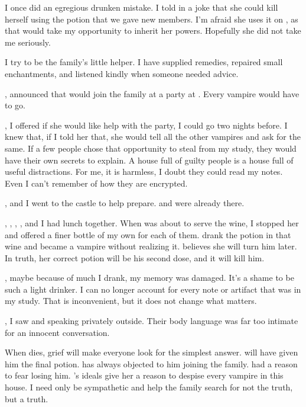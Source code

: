 {I once did an egregious drunken mistake. I told  in a joke that she could kill herself using the potion that we gave new members. I'm afraid she uses it on , as that would take my opportunity to inherit her powers. Hopefully she did not take me seriously.

I try to be the family's little helper. I have supplied remedies, repaired small enchantments, and listened kindly when someone needed advice.

,  announced that  would join the family at a party at . Every vampire would have to go.

, I offered  if she would like help with the party, I could go two nights before. I knew that, if I told her that, she would tell all the other vampires and ask for the same. If a few people chose that opportunity to steal from my study, they would have their own secrets to explain. A house full of guilty people is a house full of useful distractions. For me, it is harmless, I doubt they could read my notes. Even I can't remember of how they are encrypted.


,  and I went to the castle to help prepare.  and  were already there.

, , , , and I had lunch together. When  was about to serve the wine, I stopped her and offered a finer bottle of my own for each of them.   drank the potion in that wine and became a vampire without realizing it.  believes she will turn him later. In truth, her correct potion will be his second dose, and it will kill him.

, maybe because of much I drank, my memory was damaged. It's a shame to be such a light drinker. I can no longer account for every note or artifact that was in my study. That is inconvenient, but it does not change what matters.

, I saw  and  speaking privately outside. Their body language was far too intimate for an innocent conversation.

When  dies, grief will make everyone look for the simplest answer.  will have given him the final potion.  has always objected to him joining the family.  had a reason to fear losing him. 's ideals give her a reason to despise every vampire in this house. I need only be sympathetic and help the family search for not the truth, but a truth.

}
